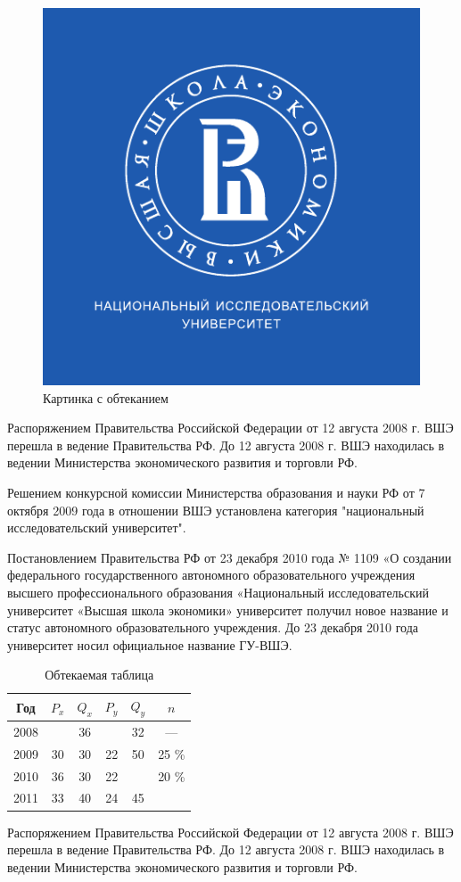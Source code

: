 \documentclass[a4paper,12pt]{article}
\begin{document}
\begin{figure}
	\includegraphics[width=\linewidth]{logo}
	\caption{Картинка с обтеканием}
\end{figure}Распоряжением Правительства Российской Федерации от 12 августа 2008 г. ВШЭ перешла в ведение Правительства РФ. До 12 августа 2008 г. ВШЭ находилась в ведении Министерства экономического развития и торговли РФ.

Решением конкурсной комиссии Министерства образования и науки РФ от 7 октября 2009 года в отношении ВШЭ установлена категория "национальный исследовательский университет". 

Постановлением Правительства РФ от 23 декабря 2010 года № 1109 «О создании федерального государственного автономного образовательного учреждения высшего профессионального образования «Национальный исследовательский университет «Высшая школа экономики» университет получил новое название и статус автономного образовательного учреждения. До 23 декабря 2010 года университет носил официальное название ГУ-ВШЭ.

\begin{table}
		\begin{tabular}{|c|c|c|c|c|c|}
			\hline
			Год & $P_x$ &$Q_x$ & $P_y$ & $Q_y$ & $n$\\ \hline
			2008 &  & 36 &  & 32 & — \\ \hline
			2009 & 30 & 30 & 22 & 50 & 25 \% \\ \hline
			2010 & 36 & 30 & 22 &  & 20 \% \\ \hline
			2011 & 33 & 40 & 24 & 45 & \\ \hline
		\end{tabular}
		\caption{Обтекаемая таблица}
\end{table}Распоряжением Правительства Российской Федерации от 12 августа 2008 г. ВШЭ перешла в ведение Правительства РФ. До 12 августа 2008 г. ВШЭ находилась в ведении Министерства экономического развития и торговли РФ.
\end{document}
